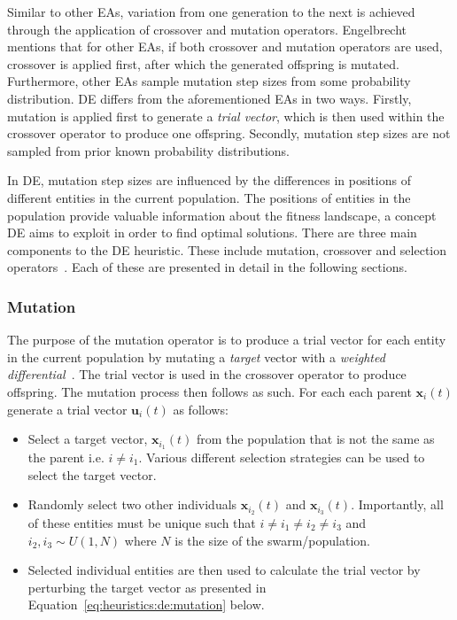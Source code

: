 Similar to other \acp{EA}, variation from one generation to the next is achieved through the application of crossover and mutation operators. Engelbrecht~\cite{ref:engelbrecht:2007} mentions that for other \acp{EA}, if both crossover and mutation operators are used, crossover is applied first, after which the generated offspring is mutated. Furthermore, other \acp{EA} sample mutation step sizes from some probability distribution. \acs{DE} differs from the aforementioned \acp{EA} in two ways. Firstly, mutation is applied first to generate a \textit{trial vector}, which is then used within the crossover operator to produce one offspring. Secondly, mutation step sizes are not sampled from prior known probability distributions.

In \acs{DE}, mutation step sizes are influenced by the differences in positions of different entities in the current population. The positions of entities in the population provide valuable information about the fitness landscape, a concept \acs{DE} aims to exploit in order to find optimal solutions. There are three main components to the \acs{DE} heuristic. These include mutation, crossover and selection operators~\cite{ref:price:2006}. Each of these are presented in detail in the following sections.

\subsubsection{Mutation}\label{sec:heuristics:mh:de:mutation}

The purpose of the mutation operator is to produce a trial vector for each entity in the current population by mutating a \textit{target} vector with a \textit{weighted differential}~\cite{ref:engelbrecht:2007}. The trial vector is used in the crossover operator to produce offspring. The mutation process then follows as such. For each each parent $\boldsymbol{x}_{i}(t)$ generate a trial vector $\boldsymbol{u}_{i}(t)$ as follows:

\begin{itemize}
      \item Select a target vector, $\boldsymbol{x}_{i_{1}}(t)$ from the population that is not the same as the parent i.e. $i \neq i_{1}$. Various different selection strategies can be used to select the target vector.

      \item Randomly select two other individuals $\boldsymbol{x}_{i_{2}}(t)$ and $\boldsymbol{x}_{i_{3}}(t)$. Importantly, all of these entities must be unique such that $i \neq i_{1} \neq i_{2} \neq i_{3}$ and $i_{2}, i_{3} \sim U(1, N)$ where $N$ is the size of the swarm/population.

      \item Selected individual entities are then used to calculate the trial vector by perturbing the target vector as presented in Equation~\eqref{eq:heuristics:de:mutation} below.
\end{itemize}


